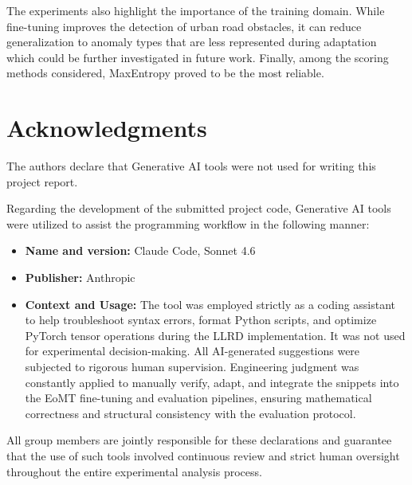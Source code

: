 \documentclass[10pt,twocolumn,letterpaper]{article}
\begin{document}
The experiments also highlight the importance of the training domain. While fine-tuning improves the detection of urban road obstacles, it can reduce generalization to anomaly types that are less represented during adaptation which could be further investigated in future work. Finally, among the scoring methods considered, MaxEntropy proved to be the most reliable.


\section*{Acknowledgments}
The authors declare that Generative AI tools were not used for writing this project report. 

Regarding the development of the submitted project code, Generative AI tools were utilized to assist the programming workflow in the following manner:
\begin{itemize}
    \item \textbf{Name and version:} Claude Code, Sonnet 4.6
    \item \textbf{Publisher:} Anthropic
    \item \textbf{Context and Usage:} The tool was employed strictly as a coding assistant to help troubleshoot syntax errors, format Python scripts, and optimize PyTorch tensor operations during the LLRD implementation. It was not used for experimental decision-making. All AI-generated suggestions were subjected to rigorous human supervision. Engineering judgment was constantly applied to manually verify, adapt, and integrate the snippets into the EoMT fine-tuning and evaluation pipelines, ensuring mathematical correctness and structural consistency with the evaluation protocol. 
\end{itemize}

All group members are jointly responsible for these declarations and guarantee that the use of such tools involved continuous review and strict human oversight throughout the entire experimental analysis process.

{\small
\nocite{*}
\printbibliography
}
\end{document}
